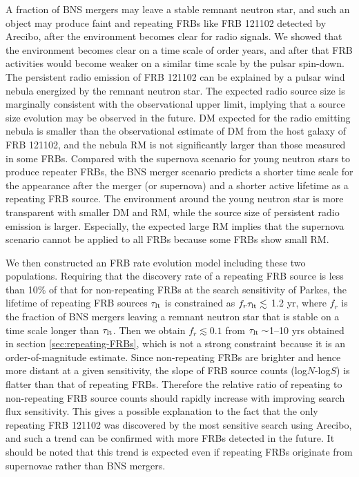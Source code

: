 \documentclass[]{pasj01}
\begin{document}
A fraction of BNS mergers may leave a stable remnant neutron star, and
such an object may produce faint and repeating FRBs like FRB 121102
detected by Arecibo, after the environment becomes clear for radio
signals. We showed that the environment becomes clear on a time scale
of order years, and after that FRB activities would become weaker on a
similar time scale by the pulsar spin-down. The persistent radio
emission of FRB 121102 can be explained by a pulsar wind nebula
energized by the remnant neutron star. The expected radio source size
is marginally consistent with the observational upper limit, implying
that a source size evolution may be observed in the future.  DM
expected for the radio emitting nebula is smaller than the
observational estimate of DM from the host galaxy of FRB 121102, and
the nebula RM is not significantly larger than those measured in some
FRBs.  Compared with the supernova scenario for young neutron stars to
produce repeater FRBs, the BNS merger scenario predicts a shorter time
scale for the appearance after the merger (or supernova) and a shorter
active lifetime as a repeating FRB source.  The environment around the
young neutron star is more transparent with smaller DM and RM, while
the source size of persistent radio emission is larger. Especially,
the expected large RM implies that the supernova scenario cannot be
applied to all FRBs because some FRBs show small RM.

We then constructed an FRB rate evolution model including these two
populations. Requiring that the discovery rate of a repeating FRB
source is less than 10\% of that for non-repeating FRBs at the search
sensitivity of Parkes, the lifetime of repeating FRB sources
$\tau_{\rm lt}$ is constrained as $f_r \tau_{\rm lt} \lesssim$ 1.2 yr,
where $f_r$ is the fraction of BNS mergers leaving a remnant neutron
star that is stable on a time scale longer than $\tau_{\rm lt}$.  Then
we obtain $f_r \lesssim 0.1$ from $\tau_{\rm lt} \sim$1--10 yrs
obtained in section \ref{sec:repeating-FRBs}, which is not a strong
constraint because it is an order-of-magnitude estimate.  Since
non-repeating FRBs are brighter and hence more distant at a given
sensitivity, the slope of FRB source counts (log$N$-log$S$) is flatter
than that of repeating FRBs.  Therefore the relative ratio of
repeating to non-repeating FRB source counts should rapidly increase
with improving search flux sensitivity. This gives a possible
explanation to the fact that the only repeating FRB 121102 was
discovered by the most sensitive search using Arecibo, and such a
trend can be confirmed with more FRBs detected in the future.  It
should be noted that this trend is expected even if repeating FRBs
originate from supernovae rather than BNS mergers.
\end{document}
